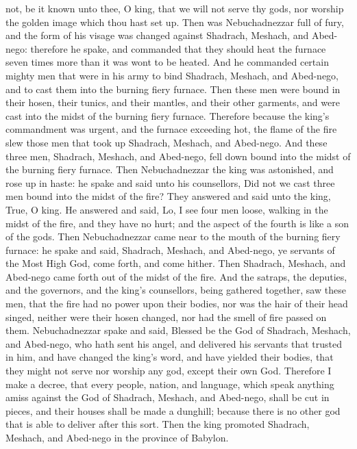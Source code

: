 not, be it known unto thee, O king, that we will not serve thy gods, nor worship the golden image which thou hast set up.  Then was Nebuchadnezzar full of fury, and the form of his visage was changed against Shadrach, Meshach, and Abed-nego: therefore he spake, and commanded that they should heat the furnace seven times more than it was wont to be heated. And he commanded certain mighty men that were in his army to bind Shadrach, Meshach, and Abed-nego, and to cast them into the burning fiery furnace. Then these men were bound in their hosen, their tunics, and their mantles, and their other garments, and were cast into the midst of the burning fiery furnace. Therefore because the king’s commandment was urgent, and the furnace exceeding hot, the flame of the fire slew those men that took up Shadrach, Meshach, and Abed-nego. And these three men, Shadrach, Meshach, and Abed-nego, fell down bound into the midst of the burning fiery furnace.  Then Nebuchadnezzar the king was astonished, and rose up in haste: he spake and said unto his counsellors, Did not we cast three men bound into the midst of the fire? They answered and said unto the king, True, O king. He answered and said, Lo, I see four men loose, walking in the midst of the fire, and they have no hurt; and the aspect of the fourth is like a son of the gods. Then Nebuchadnezzar came near to the mouth of the burning fiery furnace: he spake and said, Shadrach, Meshach, and Abed-nego, ye servants of the Most High God, come forth, and come hither. Then Shadrach, Meshach, and Abed-nego came forth out of the midst of the fire. And the satraps, the deputies, and the governors, and the king’s counsellors, being gathered together, saw these men, that the fire had no power upon their bodies, nor was the hair of their head singed, neither were their hosen changed, nor had the smell of fire passed on them.  Nebuchadnezzar spake and said, Blessed be the God of Shadrach, Meshach, and Abed-nego, who hath sent his angel, and delivered his servants that trusted in him, and have changed the king’s word, and have yielded their bodies, that they might not serve nor worship any god, except their own God. Therefore I make a decree, that every people, nation, and language, which speak anything amiss against the God of Shadrach, Meshach, and Abed-nego, shall be cut in pieces, and their houses shall be made a dunghill; because there is no other god that is able to deliver after this sort. Then the king promoted Shadrach, Meshach, and Abed-nego in the province of Babylon. 

